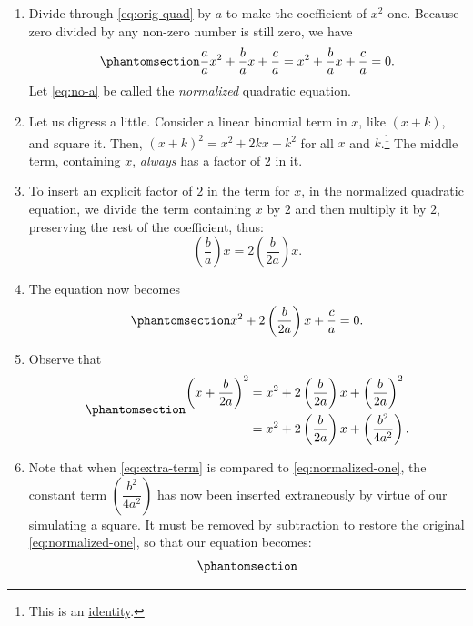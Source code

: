 \documentclass[
  a4paper,
]{article}
\begin{document}
\begin{enumerate}
\item
  Divide through \cref{eq:orig-quad} by \(a\) to make the coefficient of
  \(x^2\) one. Because zero divided by any non-zero number is still
  zero, we have \begin{equation}\phantomsection\label{eq:no-a}{
  \frac{a}{a}x^2 + \frac{b}{a}x + \frac{c}{a} = x^2 + \frac{b}{a}x + \frac{c}{a} = 0.
  }\end{equation} Let \cref{eq:no-a} be called the \emph{normalized}
  quadratic equation.
\item
  Let us digress a little. Consider a linear binomial term in \(x\),
  like \((x + k)\), and square it. Then, \((x + k)^2 = x^2 + 2kx + k^2\)
  for all \(x\) and \(k\).\footnote{This is an
    \hyperref[identities]{identity}.} The middle term, containing \(x\),
  \emph{always} has a factor of \(2\) in it.
\item
  To insert an explicit factor of \(2\) in the term for \(x\), in the
  normalized quadratic equation, we divide the term containing \(x\) by
  \(2\) and then multiply it by \(2\), preserving the rest of the
  coefficient, thus: \[
  \left(\frac{b}{a}\right)x = 2\left(\frac{b}{2a}\right)x.
  \]
\item
  The equation now becomes
  \begin{equation}\phantomsection\label{eq:normalized-one}{
  x^2 + 2\left(\frac{b}{2a}\right)x + \frac{c}{a} = 0.
  }\end{equation}
\item
  Observe that \begin{equation}\phantomsection\label{eq:extra-term}{
  \begin{aligned}
  \left(x + \frac{b}{2a}\right)^2 &= x^2 + 2\left(\frac{b}{2a}\right)x + \left(\frac{b}{2a}\right)^2\\
  &= x^2 + 2\left(\frac{b}{2a}\right)x + \left(\frac{b^2}{4a^2}\right).
  \end{aligned}
  }\end{equation}
\item
  Note that when \cref{eq:extra-term} is compared to
  \cref{eq:normalized-one}, the constant term
  \(\left(\dfrac{b^2}{4a^2}\right)\) has now been inserted extraneously
  by virtue of our simulating a square. It must be removed by
  subtraction to restore the original \cref{eq:normalized-one}, so that
  our equation becomes:
  \begin{equation}\phantomsection\label{eq:quad-formula}{
  \begin{aligned}

\end{aligned}}
\end{equation}
\end{enumerate}
\end{document}
